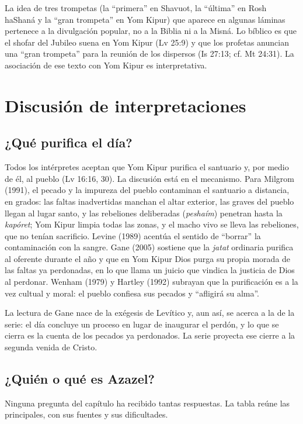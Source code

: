 \documentclass[11pt,letterpaper]{article}
\begin{document}
\begin{nota}
La idea de tres trompetas (la ``primera'' en Shavuot, la ``última'' en Rosh haShaná y la ``gran trompeta'' en Yom Kipur) que aparece en algunas láminas pertenece a la divulgación popular, no a la Biblia ni a la Misná. Lo bíblico es que el shofar del Jubileo suena en Yom Kipur (Lv 25:9) y que los profetas anuncian una ``gran trompeta'' para la reunión de los dispersos (Is 27:13; cf. Mt 24:31). La asociación de ese texto con Yom Kipur es interpretativa.
\end{nota}

\section{Discusión de interpretaciones}

\subsection{¿Qué purifica el día?}
Todos los intérpretes aceptan que Yom Kipur purifica el santuario y, por medio de él, al pueblo (Lv 16:16, 30). La discusión está en el mecanismo. Para Milgrom (1991), el pecado y la impureza del pueblo contaminan el santuario a distancia, en grados: las faltas inadvertidas manchan el altar exterior, las graves del pueblo llegan al lugar santo, y las rebeliones deliberadas (\emph{peshaím}) penetran hasta la \emph{kapóret}; Yom Kipur limpia todas las zonas, y el macho vivo se lleva las rebeliones, que no tenían sacrificio. Levine (1989) acentúa el sentido de ``borrar'' la contaminación con la sangre. Gane (2005) sostiene que la \emph{jatat} ordinaria purifica al oferente durante el año y que en Yom Kipur Dios purga su propia morada de las faltas ya perdonadas, en lo que llama un juicio que vindica la justicia de Dios al perdonar. Wenham (1979) y Hartley (1992) subrayan que la purificación es a la vez cultual y moral: el pueblo confiesa sus pecados y ``afligirá su alma''.

La lectura de Gane nace de la exégesis de Levítico y, aun así, se acerca a la de la serie: el día concluye un proceso en lugar de inaugurar el perdón, y lo que se cierra es la cuenta de los pecados ya perdonados. La serie proyecta ese cierre a la segunda venida de Cristo.

\subsection{¿Quién o qué es Azazel?}\label{sec:azazel}
Ninguna pregunta del capítulo ha recibido tantas respuestas. La tabla reúne las principales, con sus fuentes y sus dificultades.
\end{document}
